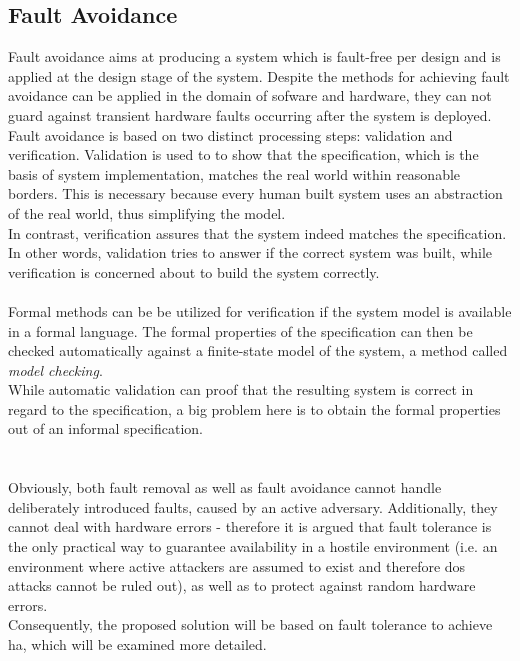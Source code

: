 \subsection{Fault Avoidance}
Fault avoidance aims at producing a system which is fault-free
per design and is applied at the design stage of the system. Despite the methods for achieving fault avoidance can be applied in the domain of sofware and hardware,
they can not guard against transient hardware faults occurring after the system is deployed.
\\
Fault avoidance is based on two distinct processing steps: validation and verification. Validation is used to to show that the specification, which is
the basis of system implementation, matches the real world within reasonable borders. This is necessary because every human built system uses an abstraction
of the real world, thus simplifying the model.
\\
In contrast, verification assures that the system indeed matches the specification. In other words, validation tries to answer if the correct system was built,
while verification is concerned about to build the system correctly.
\\
\\
Formal methods can be be utilized for verification if the system model is available in a formal language. The formal properties of the specification can then be 
checked automatically against a finite-state model of the system, a method called \textit{model checking}.
\\
While automatic validation can proof that the resulting system is correct in regard to the specification, a big problem here is to obtain the formal properties
out of an informal specification.
\\
\\
\\
Obviously, both fault removal as well as fault avoidance cannot handle deliberately introduced faults, caused by an active adversary.
Additionally, they cannot deal with hardware errors -  therefore it is argued that fault tolerance is the only practical way to guarantee availability
in a hostile environment (i.e. an environment where active attackers are assumed to exist and therefore \gls{dos} attacks cannot be ruled out), as well as to
protect against random hardware errors.
\\
Consequently, the proposed solution will be based on fault tolerance to achieve \gls{ha}, which will be examined more detailed.
 
